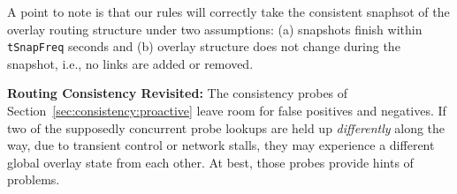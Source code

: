 \documentclass{sig-alt-full}
\renewcommand{\paragraph}[1]{{\bf #1:}}
\begin{document}
A point to note is that our rules will correctly take the consistent 
snaphsot of the overlay 
routing structure under two assumptions: (a) snapshots finish 
within \texttt{tSnapFreq} seconds and (b) overlay structure
does not change during the snapshot, i.e., no links are added or removed.



\paragraph{Routing Consistency Revisited}
The consistency probes of Section~\ref{sec:consistency:proactive} leave room
for false positives and negatives.  If two of the supposedly concurrent
probe lookups are held up \emph{differently} along the way, due to transient control or
network stalls, they may experience a different global overlay state
from each other.  At best, those probes provide hints of problems.
\end{document}

